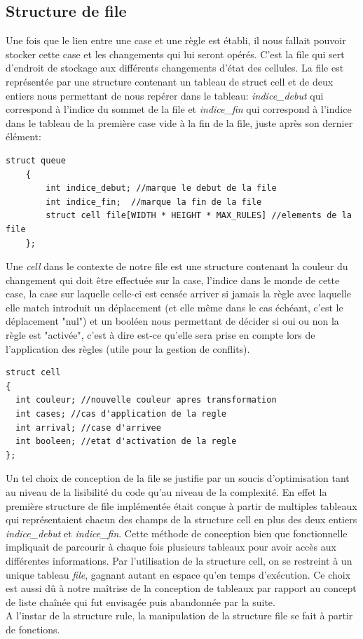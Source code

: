 \documentclass[11pt, a4paper]{article}
\begin{document}
\subsection{Structure de file}

Une fois que le lien entre une case et une règle est établi, il nous fallait pouvoir stocker cette case et les changements qui lui seront opérés. C'est la file qui sert d'endroit de stockage aux différents changements d'état des cellules.
La file est représentée par une structure contenant un tableau de struct cell et de deux entiers nous permettant de nous repérer dans le tableau: \textit{indice\_debut} qui correspond à l'indice du sommet de la file et \textit{indice\_fin} qui correspond à l'indice dans le tableau de la première case vide à la fin de la file, juste après son dernier élément:

\begin{lstlisting}[frame = single]
    struct queue
    {
        int indice_debut; //marque le debut de la file
        int indice_fin;  //marque la fin de la file
        struct cell file[WIDTH * HEIGHT * MAX_RULES] //elements de la file
    };
\end{lstlisting}
Une \textit{cell} dans le contexte de notre file est une structure contenant la couleur du changement qui doit être effectuée sur la case,
l'indice dans le monde de cette case, la case sur laquelle celle-ci est censée arriver si jamais la règle avec laquelle elle match introduit un déplacement (et elle même dans le cas échéant, c'est le déplacement "nul") et un booléen nous permettant de décider si oui ou non la règle est "activée", c'est à dire est-ce qu'elle sera prise en compte lors de l'application des règles (utile pour la gestion de conflits).\\

\begin{lstlisting}[frame = single]
struct cell 
{
  int couleur; //nouvelle couleur apres transformation
  int cases; //cas d'application de la regle
  int arrival; //case d'arrivee
  int booleen; //etat d'activation de la regle
};                      
\end{lstlisting}

Un tel choix de conception de la file se justifie par un soucis d'optimisation tant au niveau de la lisibilité du code qu'au niveau de la complexité. En effet la première structure de file implémentée était conçue à partir de multiples tableaux qui représentaient chacun des champs de la structure cell en plus des deux entiers \textit{indice\_debut} et \textit{indice\_fin}. Cette méthode de conception bien que fonctionnelle impliquait de parcourir à chaque fois plusieurs tableaux pour avoir accès aux différentes informations. Par l'utilisation de la structure cell, on se restreint à un unique tableau \textit{file}, gagnant autant en espace qu'en temps d'exécution. Ce choix est aussi dû à notre maîtrise de la conception de tableaux par rapport au concept de liste chaînée qui fut envisagée puis abandonnée par la suite. \\
A l'instar de la structure rule, la manipulation de la structure file se fait à partir de fonctions. 
\end{document}
